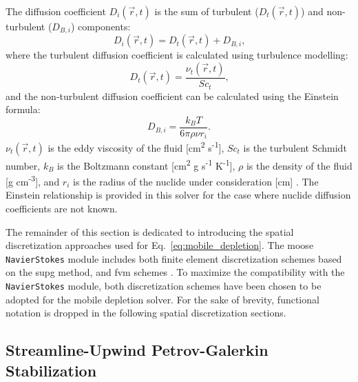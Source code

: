 The diffusion coefficient $D_{i}(\vec{r}, t)$ is the sum of turbulent ($D_{t}(\vec{r}, t)$) and non-turbulent ($D_{B,i}$) components:
\begin{equation}\label{eq:diff_coeff}
    D_{i}(\vec{r}, t) = D_{t}(\vec{r}, t) + D_{B,i}\text{,}
\end{equation}
where the turbulent diffusion coefficient is calculated using turbulence modelling:
\begin{equation}\label{eq:turb_diff}
    D_{t}(\vec{r}, t) = \frac{\nu_{t}(\vec{r}, t)}{Sc_{t}}\text{,}
\end{equation}
and the non-turbulent diffusion coefficient can be calculated using the Einstein formula:
\begin{equation}\label{eq:lam_diff}
    D_{B,i} = \frac{k_{B}T}{6\pi\rho\nu r_{i}}\text{.}
\end{equation}
$\nu_{t}(\vec{r}, t)$ is the eddy viscosity of the fluid [cm\textsuperscript{2} s\textsuperscript{-1}], $Sc_{t}$ is the turbulent Schmidt number, $k_{B}$ is the Boltzmann constant [cm\textsuperscript{2} g s\textsuperscript{-1} K\textsuperscript{-1}], $\rho$ is the density of the fluid [g cm\textsuperscript{-3}], and $r_{i}$ is the radius of the nuclide under consideration [cm] \cite{turbulent_species_transport,fusion_activation_tool_fluned}.  The Einstein relationship is provided in this solver for the case where nuclide diffusion coefficients are not known.

The remainder of this section is dedicated to introducing the spatial discretization approaches used for Eq.~\ref{eq:mobile_depletion}. The \acrshort{moose} \texttt{NavierStokes} module includes both finite element discretization schemes based on the \acrshort{supg} method, and \acrshort{fvm} schemes \cite{moose_ns_summary}. To maximize the compatibility with the \texttt{NavierStokes} module, both discretization schemes have been chosen to be adopted for the mobile depletion solver. For the sake of brevity, functional notation is dropped in the following spatial discretization sections.

\subsection{Streamline-Upwind Petrov-Galerkin Stabilization}
\label{solver:depletion:supg}

